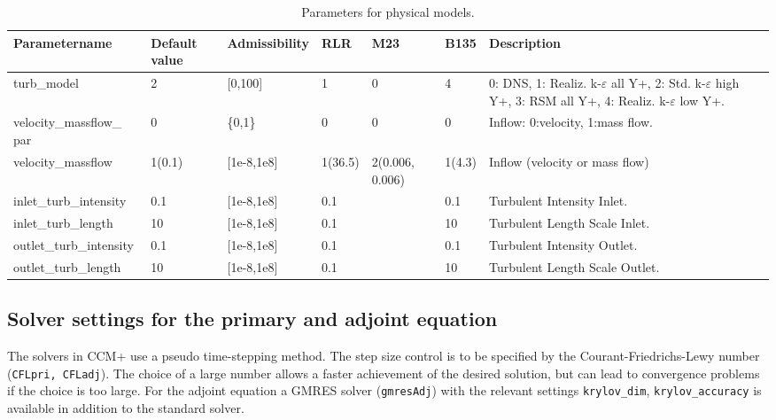 \documentclass[oneside]{article}
\numberwithin{equation}{section}
\numberwithin{figure}{section}
\numberwithin{figure}{section}
\begin{document}
\begin{table}[h]
    \centering
    \begin{tabular}{|p{2.8cm}|p{0.9cm}|p{1.5cm}|p{0.8cm}|p{1.0cm}|p{0.7cm}|p{4.3cm}|} %
        \hline
        \cellcolor{light-gray} Parametername & \cellcolor{light-gray} Default value & \cellcolor{light-gray} Admissibility & \cellcolor{light-gray} RLR & \cellcolor{light-gray} M23  & \cellcolor{light-gray} B135 & \cellcolor{light-gray} Description\\
        \hline
        turb\_model                     &   2           & [0,100]      & 1      & 0               &  4  & 0: DNS, 1: Realiz. k-$\varepsilon$ all Y+, 2: Std. k-$\varepsilon$ high Y+, 3: RSM all Y+, 4: Realiz. k-$\varepsilon$ low Y+.\\
        \hline
        velocity\_massflow\_ \quad par  &   0           & \{0,1\}      & 0      & 0               &  0  & Inflow: 0:velocity, 1:mass flow.\\
        \hline
        velocity\_massflow              &  1(0.1)       &  [1e-8,1e8]  & 1(36.5)& 2(0.006, 0.006) &  1(4.3)  & Inflow (velocity or mass flow)\\
        \hline
        inlet\_turb\_intensity          &  0.1          &  [1e-8,1e8]  & 0.1    &                 &  0.1  & Turbulent Intensity Inlet.\\
        \hline
        inlet\_turb\_length    &   \textcolor{dred}{10} &  [1e-8,1e8]   & 0.1   &                 &   10 & Turbulent Length Scale Inlet.\\
        \hline
        outlet\_turb\_intensity        &  0.1           &  [1e-8,1e8]   & 0.1   &                 &   0.1 & Turbulent Intensity Outlet.\\
        \hline
        outlet\_turb\_length      & \textcolor{dred}{10} &  [1e-8,1e8]  & 0.1   &                 &   10 & Turbulent Length Scale Outlet.\\
        \hline
    \end{tabular}
    \caption{Parameters for physical models.}\label{tab:parameter2a}
\end{table}

\subsection{Solver settings for the primary and adjoint equation}
The solvers in CCM+ use a pseudo time-stepping method. The step size control is to be specified by the Courant-Friedrichs-Lewy number (\texttt{CFLpri, CFLadj}). The choice of a large number allows a faster achievement of the desired solution, but can lead to convergence problems if the choice is too large. For the adjoint equation a GMRES solver (\texttt{gmresAdj}) with the relevant settings \verb|krylov_dim|, \verb|krylov_accuracy| is available in addition to the standard solver.
\end{document}
